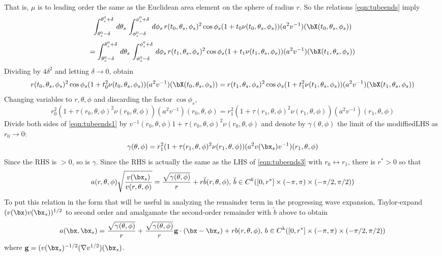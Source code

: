 That is,  $\mu$ is to leading order the same as the Euclidean area
element on the sphere of radius $r$. So the relations
\ref{eqn:tubeends} imply
\[
\int_{\theta^0_s-\delta}^{\theta^0_s+\delta}\,d\theta_s \,
\int_{\phi^0_s-\delta}^{\phi^0_s+\delta}\,d\phi_s 
          \,r(t_0,\theta_s,\phi_s)^2 \cos \phi_s (1 +t_0\nu(t_0,\theta_s,\phi_s))(a^2v^{-1})(\bX(t_0,\theta_s,\phi_s)) 
\]
\begin{equation}
\label{eqn:tubeends1}
= \int_{\theta^0_s-\delta}^{\theta^0_s+\delta}\,d\theta_s \,
\int_{\phi^0_s-\delta}^{\phi^0_s+\delta}\,d\phi_s 
          \,r(t_1,\theta_s,\phi_s)^2 \cos \phi_s (1 +t_1\nu(t_1,\theta_s,\phi_s))(a^2v^{-1})(\bX(t_1,\theta_s,\phi_s))
\end{equation}
Dividing by $4\delta^2$ and letting $\delta \rightarrow 0$, obtain
\begin{equation}
\label{eqn:tubeends2}
r(t_0,\theta_s,\phi_s)^2 \cos \phi_s (1
+t^2_0\nu(t_0,\theta_s,\phi_s))(a^2v^{-1})(\bX(t_0,\theta_s,\phi_s))=
r(t_1,\theta_s,\phi_s)^2 \cos \phi_s (1
+t^2_1\nu(t_1,\theta_s,\phi_s))(a^2v^{-1})(\bX(t_1,\theta_s,\phi_s))
\end{equation}
Changing variables to $r,\theta,\phi$ and discarding the factor $\cos
\phi_s$,
\begin{equation}
\label{eqn:tubeends3}
r_0^2 (1 +
\tau(r_0,\theta,\phi)^2\nu(r_0,\theta,\phi))(a^2v^{-1})(r_0,\theta,\phi) =
r_1^2 (1 +
\tau(r_1,\theta,\phi)^2\nu(r_1,\theta,\phi))(a^2v^{-1})(r_1,\theta,\phi)
\end{equation}
Divide both sides of \ref{eqn:tubeends1} by $v^{-1}(r_0,\theta,\phi)1 +\tau(r_0,\theta,\phi)^2\nu(r_0,\theta,\phi) $
and denote by $\gamma(\theta,\phi)$ the limit of the modiffiedLHS as  $r_0
\rightarrow 0$:
\begin{equation}
\label{eqn:tubeend4}
\gamma(\theta,\phi) = r_1^2 (1 +
\tau(r_1,\theta,\phi)^2\nu(r_1,\theta,\phi))(a^2v(\bx_s)v^{-1})(r_1,\theta,\phi)
\end{equation}
Since the RHS is $>0$, so is $\gamma$. Since the RHS is actually the
same as the LHS of \ref{eqn:tubeends3} with $r_0 \leftrightarrow r_1$,
there is $r^* >0$ so that
\[
a(r,\theta,\phi)\sqrt{\frac{v(\bx_s)}{v(r,\theta,\phi)}} = 
\frac{\sqrt{\gamma(\theta,\phi)}}{r} + r \tilde{b}(r,\theta,\phi), \,\tilde{b}\in C^k([0,r^*] \times
(-\pi,\pi) \times (-\pi/2,\pi/2)) 
\]
To put this relation in the form that will be useful in analyzing the remainder
term in the progressing wave expansion, Taylor-expand
$(v(\bx)v(\bx_s))^{1/2}$ to second order and amalgamate the
second-order remainder with $\tilde{b}$ above to obtain
\begin{equation}
\label{eqn:ampfinal}
a(\bx,\bx_s) = \frac{\sqrt{\gamma(\theta,\phi)}}{r} +
\frac{\sqrt{\gamma(\theta,\phi)}}{r} {\bf g}\cdot (\bx-\bx_s) + r b(r,\theta,\phi), \,b\in C^k([0,r^*] \times
(-\pi,\pi) \times (-\pi/2,\pi/2)) 
\end{equation}
where ${\bf g} = (v(\bx_s)^{-1/2}(\nabla v^{1/2})(\bx_s)$.


